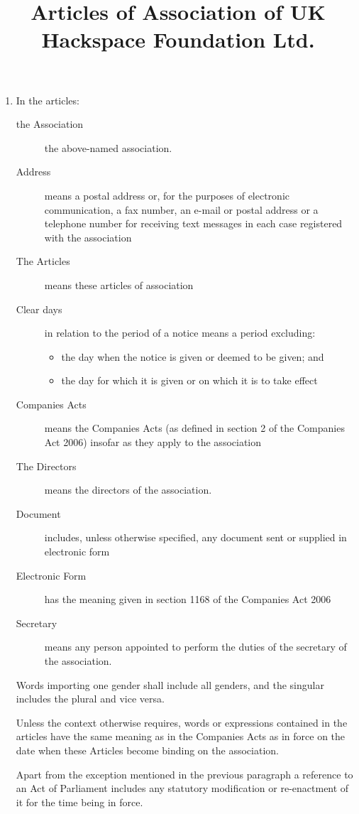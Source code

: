 \title{Articles of Association of UK Hackspace Foundation Ltd.}
\begin{enumerate}
\section{Interpretation}
\item
  In the articles:
  \begin{description}
  \item[the Association] the above-named association.
  \item[Address] means a postal address or, for the purposes of
    electronic communication, a fax number, an e-mail or postal address
    or a telephone number for receiving text messages in each case
    registered with the association
  \item[The Articles] means these articles of association
  \item[Clear days] in relation to the period of a notice means a period
    excluding:
    \begin{itemize}
    \item
      the day when the notice is given or deemed to be given; and
    \item
      the day for which it is given or on which it is to take effect
    \end{itemize}
  \item[Companies Acts] means the Companies Acts (as defined in section
    2 of the Companies Act 2006) insofar as they apply to the association
  \item[The Directors] means the directors of the association.
  \item[Document] includes, unless otherwise specified, any document sent or supplied in electronic form
  \item[Electronic Form] has the meaning given in section 1168 of the Companies Act 2006
  \item[Secretary] means any person appointed to perform the duties of
    the secretary of the association.
  \end{description}
  Words importing one gender shall include all genders, and the singular
  includes the plural and vice versa.

  Unless the context otherwise requires, words or expressions
  contained in the articles have the same meaning as in the Companies
  Acts as in force on the date when these Articles become binding
  on the association.

  Apart from the exception mentioned in the previous paragraph a
  reference to an Act of Parliament includes any statutory
  modification or re-enactment of it for the time being in force.


\end{enumerate}
